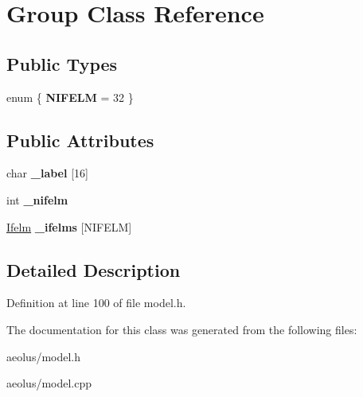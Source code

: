 \hypertarget{class_group}{}\section{Group Class Reference}
\label{class_group}
\subsection*{Public Types}
\begin{DoxyCompactItemize}
\item 
\mbox{\label{class_group_aea6a727dfef616b9f574f609d1c39388}} 
enum \{ {\bfseries N\+I\+F\+E\+LM} = 32
 \}
\end{DoxyCompactItemize}
\subsection*{Public Attributes}
\begin{DoxyCompactItemize}
\item 
\mbox{\label{class_group_a08ccd2c06711222d1566fa3bb775796b}} 
char {\bfseries \+\_\+label} \mbox{[}16\mbox{]}
\item 
\mbox{\label{class_group_a4968297b3d10c45cbff1c027fa139087}} 
int {\bfseries \+\_\+nifelm}
\item 
\mbox{\label{class_group_a3f3dbd00b780236f4d9c525eb4856fe2}} 
\hyperlink{class_ifelm}{Ifelm} {\bfseries \+\_\+ifelms} \mbox{[}N\+I\+F\+E\+LM\mbox{]}
\end{DoxyCompactItemize}


\subsection{Detailed Description}


Definition at line 100 of file model.\+h.



The documentation for this class was generated from the following files\+:\begin{DoxyCompactItemize}
\item 
aeolus/model.\+h\item 
aeolus/model.\+cpp\end{DoxyCompactItemize}
